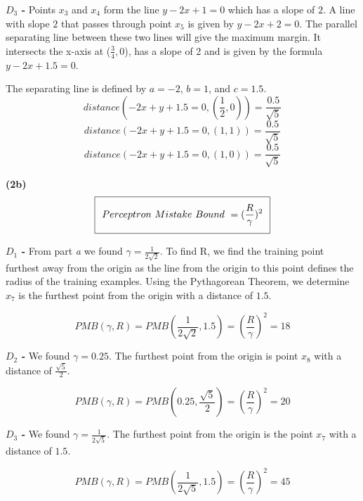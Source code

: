 \documentclass[11pt]{article}
\renewcommand\part[1]{\vspace{.10in}\textbf{(#1)}}
\begin{document}
\textbf{$D_3$ - } Points $x_3$ and $x_4$ form the line $y - 2x + 1 = 0$ which has a slope of $2$. A line with slope $2$ that passes through point $x_5$ is given by $y - 2x + 2 = 0$. The parallel separating line between these two lines will give the maximum margin. It intersects the x-axis at ($\frac{3}{4}, 0$), has a slope of 2 and is given by the formula $y - 2x + 1.5 = 0$. 

The separating line is defined by $a = -2$, $b = 1$, and $c = 1.5$.
$$distance(-2x + y + 1.5 = 0, (\frac{1}{2}, 0)) = \frac{0.5}{\sqrt{5}}$$
$$distance(-2x + y + 1.5 = 0, (1, 1)) = \frac{0.5}{\sqrt{5}}$$
$$distance(-2x + y + 1.5 = 0, (1, 0)) = \frac{0.5}{\sqrt{5}}$$


\part{2b} 
\begin{equation}
\setlength\fboxsep{0.25cm}
\setlength\fboxrule{0.4pt}
\boxed{Perceptron \ Mistake \ Bound  \ = (\frac{R}{\gamma})^2}
\end{equation} 

\textbf{$D_1$ - }  From part \textit{a} we found $\gamma = \frac{1}{2\sqrt{2}}$. To find R, we find the training point furthest away from the origin as the line from the origin to this point defines the radius of the training examples. Using the Pythagorean Theorem, we determine $x_7$ is the furthest point from the origin with a distance of $1.5$.

$$PMB(\gamma, R) = PMB(\frac{1}{2\sqrt{2}}, 1.5) = (\frac{R}{\gamma})^2 = 18$$


\textbf{$D_2$ -} We found $\gamma = 0.25$. The furthest point from the origin is point $x_8$ with a distance of $\frac{\sqrt{5}}{2}$.

$$PMB(\gamma, R) = PMB(0.25, \frac{\sqrt{5}}{2}) = (\frac{R}{\gamma})^2 = 20$$


\textbf{$D_3$ - } We found $\gamma = \frac{1}{2\sqrt{5}}$. The furthest point from the origin is the point $x_7$ with a distance of $1.5$.

$$PMB(\gamma, R) = PMB(\frac{1}{2\sqrt{5}}, 1.5) = (\frac{R}{\gamma})^2 = 45$$

\end{document}
